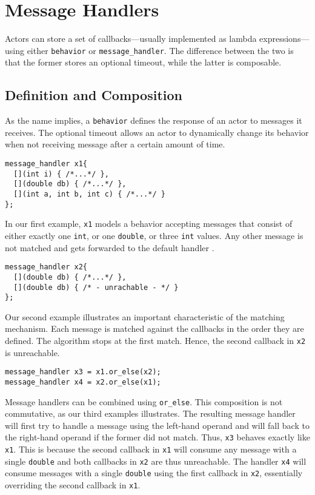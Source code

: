 \section{Message Handlers}
\label{message-handlers}

Actors can store a set of callbacks---usually implemented as lambda expressions---using either \lstinline^behavior^ or \lstinline^message_handler^.
The difference between the two is that the former stores an optional timeout, while the latter is composable.

\subsection{Definition and Composition}

As the name implies, a \lstinline^behavior^ defines the response of an actor to messages it receives. The optional timeout allows an actor to dynamically change its behavior when not receiving message after a certain amount of time.

\begin{lstlisting}
message_handler x1{
  [](int i) { /*...*/ },
  [](double db) { /*...*/ },
  [](int a, int b, int c) { /*...*/ }
};
\end{lstlisting}

In our first example, \lstinline^x1^ models a behavior accepting messages that consist of either exactly one \lstinline^int^, or one \lstinline^double^, or three \lstinline^int^ values.
Any other message is not matched and gets forwarded to the default handler .

\begin{lstlisting}
message_handler x2{
  [](double db) { /*...*/ },
  [](double db) { /* - unrachable - */ }
};
\end{lstlisting}

Our second example illustrates an important characteristic of the matching mechanism. Each message is matched against the callbacks in the order they are defined. The algorithm stops at the first match. Hence, the second callback in \lstinline^x2^ is unreachable.

\begin{lstlisting}
message_handler x3 = x1.or_else(x2);
message_handler x4 = x2.or_else(x1);
\end{lstlisting}

Message handlers can be combined using \lstinline^or_else^. This composition is not commutative, as our third examples illustrates. The resulting message handler will first try to handle a message using the left-hand operand and will fall back to the right-hand operand if the former did not match. Thus, \lstinline^x3^ behaves exactly like \lstinline^x1^. This is because the second callback in \lstinline^x1^ will consume any message with a single \lstinline^double^ and both callbacks in \lstinline^x2^ are thus unreachable. The handler \lstinline^x4^ will consume messages with a single \lstinline^double^ using the first callback in \lstinline^x2^, essentially overriding the second callback in \lstinline^x1^.


